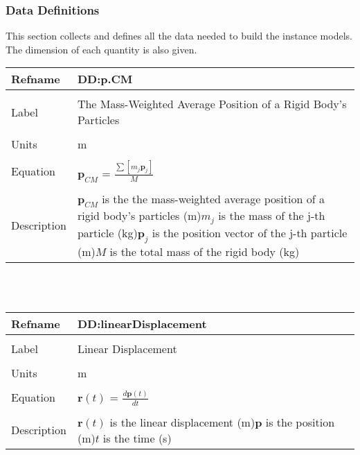 \documentclass[12pt]{article}
\begin{document}
\subsubsection{Data Definitions}
\label{Sec:DDs}
This section collects and defines all the data needed to build the instance models. The dimension of each quantity is also given.
~\newline
\noindent \begin{minipage}{\textwidth}
\begin{tabular}{p{} p{}}
\toprule \textbf{Refname} & \textbf{DD:p.CM}
\label{DD:p.CM}
\\ \midrule \\
Label & The Mass-Weighted Average Position of a Rigid Body's Particles
\\ \midrule \\
Units & m
\\ \midrule \\
Equation & ${\mathbf{p}_{CM}}$ = $\frac{\displaystyle\sum{\left[{m_{j}} {\mathbf{p}_{j}}\right]}}{M}$
\\ \midrule \\
Description & ${\mathbf{p}_{CM}}$ is the the mass-weighted average position of a rigid body's particles (m)\newline${m_{j}}$ is the mass of the j-th particle (kg)\newline${\mathbf{p}_{j}}$ is the position vector of the j-th particle (m)\newline$M$ is the total mass of the rigid body (kg)
\\ \bottomrule \end{tabular}
\end{minipage}\\
~\newline
\noindent \begin{minipage}{\textwidth}
\begin{tabular}{p{} p{}}
\toprule \textbf{Refname} & \textbf{DD:linearDisplacement}
\label{DD:linearDisplacement}
\\ \midrule \\
Label & Linear Displacement
\\ \midrule \\
Units & m
\\ \midrule \\
Equation & $\mathbf{r}(t)$ = $\frac{d \mathbf{p}\left(t\right)}{d t}$
\\ \midrule \\
Description & $\mathbf{r}(t)$ is the linear displacement (m)\newline$\mathbf{p}$ is the position (m)\newline$t$ is the time (s)
\\ \bottomrule \end{tabular}
\end{minipage}\\
\end{document}
